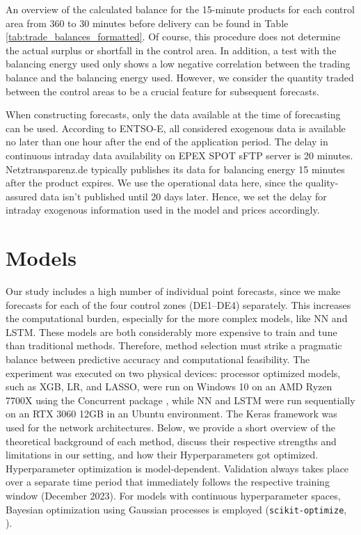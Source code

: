 \documentclass[preprint,12pt,nonatbib]{elsarticle}
\begin{document}
An overview of the calculated balance for the 15-minute products for each control area from 360 to 30 minutes before delivery can be found in Table \ref{tab:trade_balances_formatted}.
Of course, this procedure does not determine the actual surplus or shortfall in the control area.
In addition, a test with the balancing energy used only shows a low negative correlation between the trading balance and the balancing energy used.
However, we consider the quantity traded between the control areas to be a crucial feature for subsequent forecasts.

When constructing forecasts, only the data available at the time of forecasting can be used.
According to ENTSO-E, all considered exogenous data is available no later than one hour after the end of the application period.
The delay in continuous intraday data availability on EPEX SPOT sFTP server is 20 minutes.
Netztransparenz.de typically publishes its data for balancing energy 15 minutes after the product expires.
We use the operational data here, since the quality-assured data isn't published until 20 days later.
Hence, we set the delay for intraday exogenous information used in the model and prices accordingly.

\section{Models}
Our study includes a high number of individual point forecasts, since we make forecasts for each of the four control zones (DE1–DE4) separately. 
This increases the computational burden, especially for the more complex models, like NN and LSTM.
These models are both considerably more expensive to train and tune than traditional methods.
Therefore, method selection must strike a pragmatic balance between predictive accuracy and computational feasibility. The experiment was executed on two physical devices:
processor optimized models, such as XGB, LR, and LASSO, were run on Windows 10 on an AMD Ryzen 7700X using the Concurrent package \cite{PythonConcurrentFutures}, while NN and LSTM were run sequentially on an RTX 3060 12GB in an Ubuntu environment.
The Keras framework \cite{chollet2015keras} was used for the network architectures.
Below, we provide a short overview of the theoretical background of each method, discuss their respective strengths and limitations in our setting, and how their Hyperparameters got optimized.
Hyperparameter optimization is model-dependent.
Validation always takes place over a separate time period that immediately follows the respective training window (December 2023).
For models with continuous hyperparameter spaces, Bayesian optimization using Gaussian processes is employed (\texttt{scikit-optimize}, \cite{Bergstra.2011}).
\end{document}
